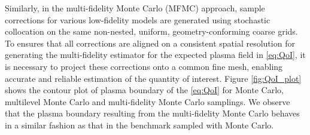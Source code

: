 Similarly, in the multi-fidelity Monte Carlo (MFMC) approach, sample corrections for various low-fidelity models are generated using stochastic collocation on the same non-nested, uniform, geometry-conforming coarse grids. To ensures that all corrections are aligned on a consistent spatial resolution for generating the multi-fidelity estimator for the expected plasma field in \eqref{eq:QoI}, it is necessary to project these corrections onto a common fine mesh, enabling accurate and reliable estimation of the quantity of interest. Figure \ref{fig:QoI_plot} shows the contour plot of plasma boundary of the \eqref{eq:QoI} for Monte Carlo, multilevel Monte Carlo and multi-fidelity Monte Carlo samplings. We observe that the plasma boundary resulting from the multi-fidelity Monte Carlo behaves in a similar fashion as that in the benchmark sampled with Monte Carlo.

















